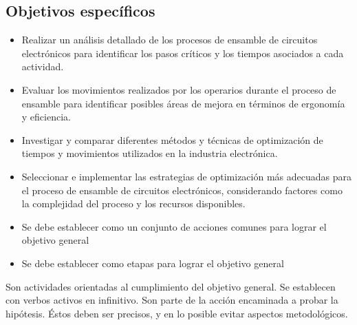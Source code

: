     \subsection{Objetivos específicos }
    
    \begin{itemize}
        \item Realizar un análisis detallado de los procesos de ensamble de circuitos electrónicos para identificar los pasos críticos y los tiempos asociados a cada actividad.
        \item Evaluar los movimientos realizados por los operarios durante el proceso de ensamble para identificar posibles áreas de mejora en términos de ergonomía y eficiencia.
        \item Investigar y comparar diferentes métodos y técnicas de optimización de tiempos y movimientos utilizados en la industria electrónica.
        \item Seleccionar e implementar las estrategias de optimización más adecuadas para el proceso de ensamble de circuitos electrónicos, considerando factores como la complejidad del proceso y los recursos disponibles.
    \end{itemize} 
    \begin{itemize}
        \item Se debe establecer como un conjunto de acciones comunes para lograr el objetivo general
        \item Se debe establecer como etapas para lograr el objetivo general
    \end{itemize}
    
    Son actividades orientadas al cumplimiento del objetivo general. Se establecen con verbos activos en infinitivo. Son parte de la acción encaminada a probar la hipótesis. Éstos deben ser precisos, y en lo posible evitar aspectos metodológicos.
